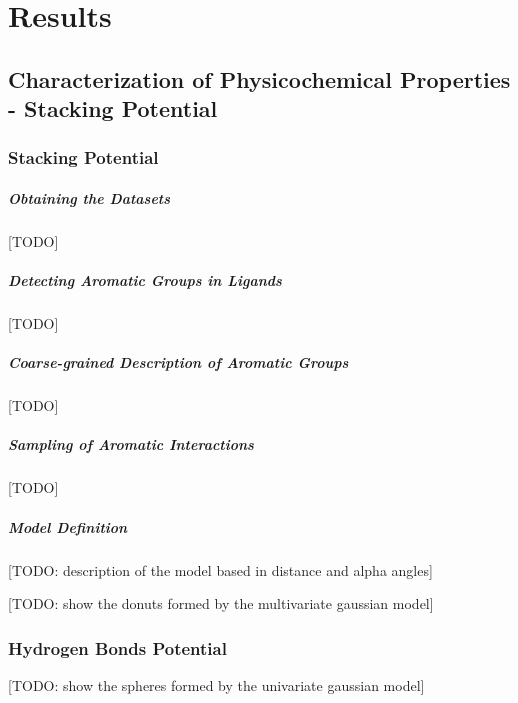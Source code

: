 \chapter{Results} %

\section{Characterization of Physicochemical Properties - Stacking Potential}
  \subsection{Stacking Potential}
    \paragraph*{Obtaining the Datasets}
      [TODO]

    \paragraph*{Detecting Aromatic Groups in Ligands}
      [TODO]

    \paragraph*{Coarse-grained Description of Aromatic Groups}
      [TODO]

    \paragraph*{Sampling of Aromatic Interactions}
      [TODO]

    \paragraph*{Model Definition}
      [TODO: description of the model based in distance and alpha angles]

      [TODO: show the donuts formed by the multivariate gaussian model]

  \subsection{Hydrogen Bonds Potential}
    [TODO: show the spheres formed by the univariate gaussian model]

